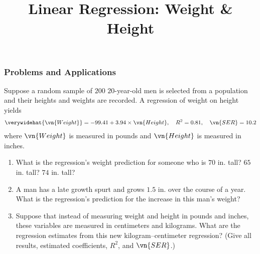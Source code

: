 \title[Weight]{Linear Regression: Weight \& Height}
\date{}







\def\ask{\begin{align*}
\verywidehat{\vn{Weight}} 
  = -99.41 + 3.94 \times \vn{Height},
  \quad R^2 = 0.81,
  \quad \vn{SER} = 10.2
\end{align*}}


\begin{frame}
\frametitle{Problems and Applications}
Suppose a random sample of $200$ $20$-year-old men is selected from a population and their heights and weights are recorded. A regression of weight on height yields
\ask
where $\vn{Weight}$ is measured in pounds and $\vn{Height}$ is measured in inches. 
\begin{enumerate}
\item What is the regression's weight prediction for someone who is $70$ in. tall? $65$ in. tall? $74$ in. tall?
\item A man has a late growth spurt and grows $1.5$ in. over the course of a year. What is the regression's prediction for the increase in this man's weight?
\item Suppose that instead of measuring weight and height in pounds and inches, these variables are measured in centimeters and kilograms. What are the regression estimates from this new kilogram–centimeter regression? (Give all results, estimated coefficients, $R^{2}$, and $\vn{SER}$.)
\end{enumerate}
\end{frame}


